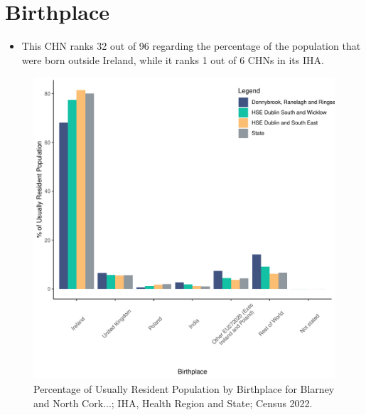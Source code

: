 \documentclass{article}
\begin{document}
\section{Birthplace}\label{sect:Birth}
\begin{itemize}
\item This CHN ranks  32 out of 96 regarding the percentage of the population that were born outside Ireland, while it ranks  1 out of 6 CHNs in its IHA.
\end{itemize}
\begin{figure}[H]
	\centering
	\includegraphics[width = 130mm]{../figures/BirthED.pdf}
	\caption{Percentage of Usually Resident Population by Birthplace for Blarney and North Cork...; IHA, Health Region and State; Census 2022.}
	\label{fig:vbnv}
	\end{figure}
	
\end{document}
